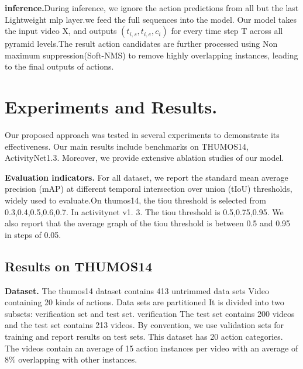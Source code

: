 \documentclass[10pt,twocolumn,letterpaper]{article}
\begin{document}
\textbf{inference.}During inference, we ignore the action predictions from all but the last Lightweight mlp layer.we feed the full sequences
into the model. Our model takes the input video X, and outputs 
$(t_{i,s}, t_{i,e}, c_i)$
for every time step T across all pyramid
levels.The result action candidates are further processed
using Non maximum suppression(Soft-NMS)\cite{bodla2017soft} to remove highly overlapping instances,
leading to the final outputs of actions.

\section{Experiments and Results.}
Our proposed approach was tested in several experiments to demonstrate its effectiveness. Our main results include benchmarks on THUMOS14\cite{THUMOS14}, ActivityNet1.3\cite{caba2015activitynet}. Moreover, we provide extensive ablation studies of our model.

\textbf{Evaluation indicators.} 
For all dataset, we report the standard
mean average precision (mAP) at different temporal intersection over union (tIoU) thresholds, widely used to evaluate.On thumos14, the tiou threshold is selected from {0.3,0.4,0.5,0.6,0.7}. In activitynet v1. 3. The tiou threshold is {0.5,0.75,0.95}. We also report that the average graph of the tiou threshold is between 0.5 and 0.95 in steps of 0.05. 
\subsection{Results on THUMOS14}
\textbf{Dataset.} The thumos14 dataset contains 413 untrimmed data sets
Video containing 20 kinds of actions. Data sets are partitioned
It is divided into two subsets: verification set and test set. verification
The test set contains 200 videos and the test set contains 213 videos.
By convention, we use validation sets for training and report results on test sets.
This dataset has 20 action categories. The videos
contain an average of 15 action instances per video with an
average of 8\% overlapping with other instances.
\end{document}
